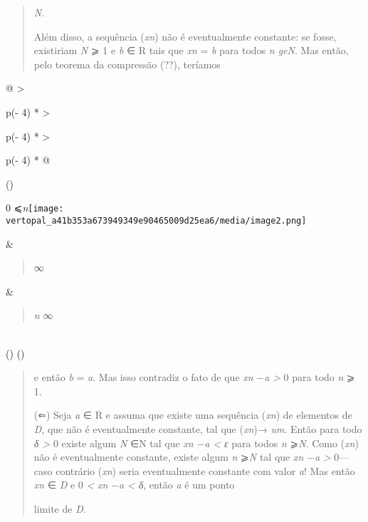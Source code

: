 \documentclass[
]{article}
\begin{document}
\begin{quote}
\emph{N}.

Além disso, a sequência (\emph{xn}) não é eventualmente constante: se
fosse, existiriam \emph{N} ⩾ 1 e \emph{b} ∈ R tais que \emph{xn} =
\emph{b} para todos \emph{n geN}. Mas então, pelo teorema da compressão
(??), teríamos
\end{quote}

\begin{longtable}[]{@{}
  >{\raggedright\arraybackslash}p{(\columnwidth - 4\tabcolsep) * }
  >{\raggedright\arraybackslash}p{(\columnwidth - 4\tabcolsep) * }
  >{\raggedright\arraybackslash}p{(\columnwidth - 4\tabcolsep) * }@{}}
\toprule()
\begin{minipage}[b]{\linewidth}\raggedright
0
⩽\emph{n}\texttt{[image: vertopal\_a41b353a673949349e90465009d25ea6/media/image2.png]}
\end{minipage} & \begin{minipage}[b]{\linewidth}\raggedright
\begin{quote}
∞
\end{quote}
\end{minipage} & \begin{minipage}[b]{\linewidth}\raggedright
\begin{quote}
\emph{n} ∞
\end{quote}
\end{minipage} \\
\midrule()
\endhead
\bottomrule()
\end{longtable}

\begin{quote}
e então \emph{b} = \emph{a}. Mas isso contradiz o fato de que
\textbar{}\emph{xn} −\emph{a}\textbar{} \emph{\textgreater{}} 0 para
todo \emph{n} ⩾ 1.

(⇐) Seja \emph{a} ∈ R e assuma que existe uma sequência (\emph{xn}) de
elementos de \emph{D}, que não é eventualmente constante, tal que
(\emph{xn})→ \emph{um}. Então para todo \emph{δ \textgreater{}} 0 existe
algum \emph{N} ∈N tal que \textbar{}\emph{xn} −\emph{a}\textbar{}
\emph{\textless{} ε} para todos \emph{n} ⩾\emph{N}. Como (\emph{xn}) não
é eventualmente constante, existe algum \emph{n} ⩾\emph{N} tal que
\textbar{}\emph{xn} −\emph{a}\textbar{} \emph{\textgreater{}} 0---caso
contrário (\emph{xn}) seria eventualmente constante com valor \emph{a}!
Mas então \emph{xn} ∈ \emph{D} e 0 \emph{\textless{}}
\textbar{}\emph{xn} −\emph{a}\textbar{} \emph{\textless{} δ}, então
\emph{a} é um ponto

limite de \emph{D}.
\end{quote}
\end{document}
